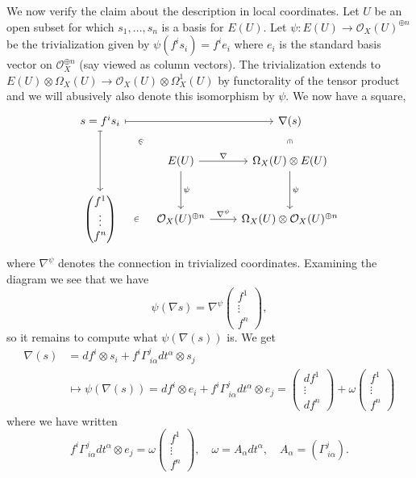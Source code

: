 \documentclass[12pt]{book}
\numberwithin{equation}{section}
\theoremstyle{definition}
\theoremstyle{remark}
\newcommand{\Ocal}{\mathcal{O}}
\begin{document}
We now verify the claim about the description in local coordinates.
Let $U$ be an open subset for which $s_1,\ldots,s_n$ is a basis for $E(U)$. 
Let $\psi: E(U) \to \Ocal_X(U)^{\oplus n}$ be the trivialization given by $\psi(f^is_i) = f^ie_i$ where $e_i$ is the standard basis vector on $\Ocal_X^{\oplus n}$ (say viewed as column vectors).
The trivialization extends to $E(U) \otimes \Omega_X(U) \to \Ocal_X(U) \otimes \Omega_X^1(U)$ by functorality of the tensor product and we will abusively also denote this isomorphism by $\psi$. 
We now have a square,
$$\begin{tikzcd}[contains/.style = {draw=none,"\in" description,sloped}]
s=f^is_i \arrow[dd,mapsto] \arrow[dr, contains] \arrow[rr,mapsto]& & \nabla(s) \arrow[d,contains] \\ 
& E(U) \arrow[r, "\nabla"] \arrow[d,above,"\psi"]& \Omega_X(U) \otimes E(U)  \arrow[d, "\psi"]\\
\begin{pmatrix}
f^1 \\
\vdots \\
f^n 
\end{pmatrix}\arrow[r,contains]& \Ocal_X(U)^{\oplus n} \arrow[r, "\nabla^{\psi}"] & \Omega_X(U) \otimes \Ocal_X(U)^{\oplus n}
\end{tikzcd}$$
where $\nabla^{\psi}$ denotes the connection in trivialized coordinates. 
Examining the diagram we see that we have 
$$ \psi(\nabla s) = \nabla^{\psi} \begin{pmatrix}
f^1 \\
\vdots \\
f^n 
\end{pmatrix},$$
so it remains to compute what $\psi(\nabla(s))$ is.
We get 
\begin{align*}
\nabla(s) &= df^i\otimes s_i + f^i \Gamma^j_{\ i \alpha} dt^{\alpha} \otimes s_j \\
&\mapsto \psi(\nabla(s))  =df^i \otimes e_i + f^i \Gamma^j_{\ i \alpha} dt^{\alpha} \otimes e_j = \begin{pmatrix}
df^1 \\
\vdots \\
df^n
\end{pmatrix} + \omega \begin{pmatrix}
f^1 \\
\vdots \\
f^n
\end{pmatrix}
\end{align*}
where we have written
$$ f^i \Gamma^j_{\ i \alpha} dt^{\alpha} \otimes e_j= \omega \begin{pmatrix}
f^1 \\
\vdots \\
f^n
\end{pmatrix}, \quad \omega = A_{\alpha} dt^{\alpha}, \quad A_{\alpha} = (\Gamma^j_{\ i \alpha}).$$
\end{document}
